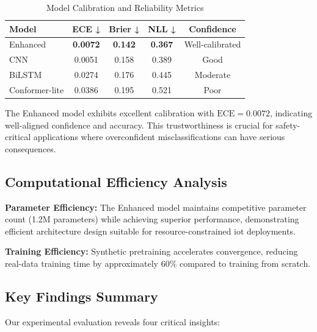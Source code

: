 \documentclass[journal]{IEEEtran}
\begin{document}
\begin{table}[ht]
\centering
\caption{Model Calibration and Reliability Metrics}
\begin{tabular}{@{}lcccc@{}}
\toprule
Model & ECE ↓ & Brier ↓ & NLL ↓ & Confidence \\
\midrule
Enhanced & \textbf{0.0072} & \textbf{0.142} & \textbf{0.367} & Well-calibrated \\
CNN & 0.0051 & 0.158 & 0.389 & Good \\
BiLSTM & 0.0274 & 0.176 & 0.445 & Moderate \\
Conformer-lite & 0.0386 & 0.195 & 0.521 & Poor \\
\bottomrule
\end{tabular}
\label{tab:calibration}
\end{table}

The Enhanced model exhibits excellent calibration with $\text{ECE}=0.0072$, indicating well-aligned confidence and accuracy. This trustworthiness is crucial for safety-critical applications where overconfident misclassifications can have serious consequences.

\subsection{Computational Efficiency Analysis}

\textbf{Parameter Efficiency:} The Enhanced model maintains competitive parameter count (1.2M parameters) while achieving superior performance, demonstrating efficient architecture design suitable for resource-constrained \gls{iot} deployments.

\textbf{Training Efficiency:} Synthetic pretraining accelerates convergence, reducing real-data training time by approximately 60\% compared to training from scratch.

\subsection{Key Findings Summary}

Our experimental evaluation reveals four critical insights:
\end{document}
